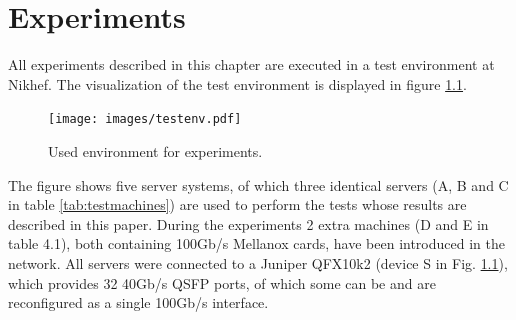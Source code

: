 \chapter{Experiments}\label{ch:experiments}
All experiments described in this chapter are executed in a test environment at Nikhef. The visualization of the test environment is displayed in figure \ref{fig:testenv}. \\ 

\begin{figure}[H]
  \texttt{[image: images/testenv.pdf]}
  \caption{Used environment for experiments.}
  \label{fig:testenv}
\end{figure}

The figure shows five server systems, of which three identical servers (A, B and C in table \ref{tab:testmachines}) are used to perform the tests whose results are described in this paper.
During the experiments 2 extra machines (D and E in table 4.1), both containing 100Gb/s Mellanox cards, have been introduced in the network. All servers were connected to a Juniper QFX10k2 (device S in Fig. \ref{fig:testenv}), which provides 32 40Gb/s QSFP ports, of which some can be and are reconfigured as a single 100Gb/s interface.

